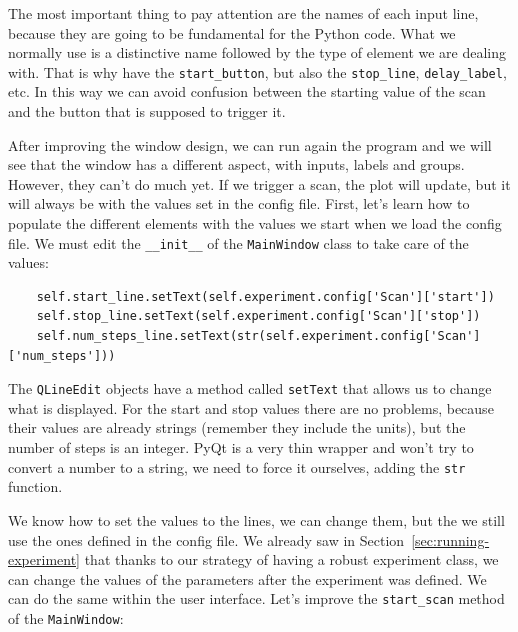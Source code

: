 The most important thing to pay attention are the names of each input line, because they are going to be fundamental for the Python code. What we normally use is a distinctive name followed by the type of element we are dealing with. That is why have the \texttt{start\_button}, but also the \texttt{stop\_line}, \texttt{delay\_label}, etc. In this way we can avoid confusion between the starting value of the scan and the button that is supposed to trigger it.


After improving the window design, we can run again the program and we will see that the window has a different aspect, with inputs, labels and groups. However, they can't do much yet. If we trigger a scan, the plot will update, but it will always be with the values set in the config file. First, let's learn how to populate the different elements with the values we start when we load the config file. We must edit the \texttt{\_\_init\_\_} of the \texttt{MainWindow} class to take care of the values:

\begin{verbatim}
    self.start_line.setText(self.experiment.config['Scan']['start'])
    self.stop_line.setText(self.experiment.config['Scan']['stop'])
    self.num_steps_line.setText(str(self.experiment.config['Scan']['num_steps']))
\end{verbatim}

The \texttt{QLineEdit} objects have a method called \texttt{setText} that allows us to change what is displayed. For the start and stop values there are no problems, because their values are already strings (remember they include the units), but the number of steps is an integer. PyQt is a very thin wrapper and won't try to convert a number to a string, we need to force it ourselves, adding the \texttt{str} function.


We know how to set the values to the lines, we can change them, but the we still use the ones defined in the config file. We already saw in Section~\ref{sec:running-experiment} that thanks to our strategy of having a robust experiment class, we can change the values of the parameters after the experiment was defined. We can do the same within the user interface. Let's improve the \texttt{start\_scan} method of the \texttt{MainWindow}:


